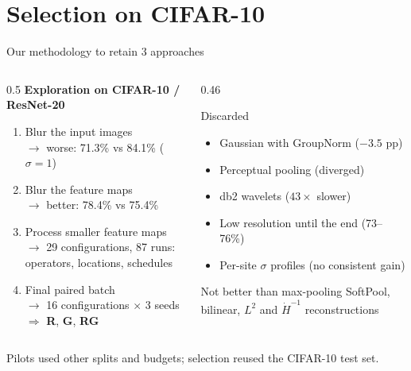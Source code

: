 \documentclass[10pt,aspectratio=169]{beamer}
\newcommand{\Rm}{\textcolor{cR}{\textbf{R}}}
\newcommand{\Gm}{\textcolor{cG}{\textbf{G}}}
\newcommand{\RGm}{\textcolor{cRG}{\textbf{RG}}}
\begin{document}
\section{Selection on CIFAR-10}
\begin{frame}{Our methodology to retain 3 approaches}
\begin{columns}[T]
\begin{column}{0.5\textwidth}
  \textbf{Exploration on CIFAR-10 / ResNet-20}
  \begin{enumerate}
    \item Blur the input images \\
          {\small $\rightarrow$ worse: 71.3\% vs 84.1\% ($\sigma=1$)}
    \item Blur the feature maps \\
          {\small $\rightarrow$ better: 78.4\% vs 75.4\%}
    \item Process smaller feature maps \\
          {\small $\rightarrow$ 29 configurations, 87 runs: operators, locations, schedules}
    \item Final paired batch \\
          {\small $\rightarrow$ 16 configurations $\times$ 3 seeds $\Rightarrow$ \Rm, \Gm, \RGm}
  \end{enumerate}
\end{column}
\begin{column}{0.46\textwidth}
  \begin{alertblock}{Discarded}
  \small
  \begin{itemize}
    \item Gaussian with GroupNorm ($-3.5$ pp)
    \item Perceptual pooling (diverged)
    \item db2 wavelets ($43\times$ slower)
    \item Low resolution until the end (73--76\%)
    \item Per-site $\sigma$ profiles (no consistent gain)
  \end{itemize}
  \end{alertblock}
  \begin{block}{Not better than max-pooling}
  \small SoftPool, bilinear, $L^2$ and $\dot H^{-1}$ reconstructions
  \end{block}
\end{column}
\end{columns}

\vfill
{\scriptsize Pilots used other splits and budgets; selection reused the CIFAR-10 test set.}
\end{frame}
\end{document}
